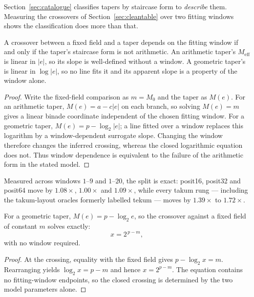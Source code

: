 \label{sec:formprescribes}

Section~\ref{sec:catalogue} classifies tapers by staircase form to \emph{describe}
them. Measuring the crossovers of Section~\ref{sec:cleantable} over two fitting
windows shows the classification does more than that.

\begin{theorem}
\label{thm:formwindow}
A crossover between a fixed field and a taper depends on the fitting window if
and only if the taper's staircase form is not arithmetic. An arithmetic taper's
$M_{\mathrm{eff}}$ is linear in $|e|$, so its slope is well-defined without a
window. A geometric taper's is linear in $\log|e|$, so no line fits it and its
apparent slope is a property of the window alone.
\end{theorem}
\begin{proof}
Write the fixed-field comparison as $m=M_0$ and the taper as $M(e)$.
For an arithmetic taper, $M(e)=a-c|e|$ on each branch, so solving
$M(e)=m$ gives a linear binade coordinate independent of the chosen fitting
window.  For a geometric taper, $M(e)=p-\log_2|e|$; a line fitted over
a window replaces this logarithm by a window-dependent surrogate slope.
Changing the window therefore changes the inferred crossing, whereas the
closed logarithmic equation does not.  Thus window dependence is equivalent
to the failure of the arithmetic form in the stated model.
\end{proof}

Measured across windows $1$--$9$ and $1$--$20$, the split is exact: posit16,
posit32 and posit64 move by $1.08\times$, $1.00\times$ and $1.09\times$, while
every takum rung --- including the takum-layout oracles formerly labelled
tekum --- moves by $1.39\times$ to $1.72\times$.

\begin{corollary}
\label{cor:geomcross}
For a geometric taper, $M(e) = p - \log_2 e$, so the crossover against a fixed
field of constant $m$ solves exactly:
\[
  x = 2^{\,p-m},
\]
with no window required.
\end{corollary}
\begin{proof}
At the crossing, equality with the fixed field gives
$p-\log_2 x=m$.  Rearranging yields $\log_2 x=p-m$ and hence
$x=2^{p-m}$.  The equation contains no fitting-window endpoints, so the
closed crossing is determined by the two model parameters alone.
\end{proof}

